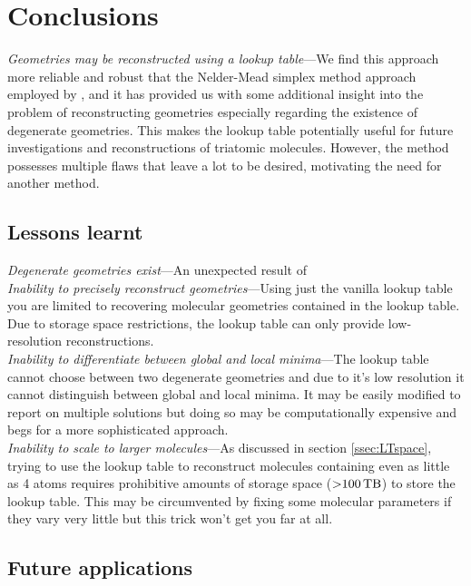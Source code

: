 \begin{figure}
  \label{fig:DegenerateGeometryTrajectories}
\end{figure}

\section{Conclusions}
\emph{Geometries may be reconstructed using a lookup table}---We find this approach more reliable and robust that the Nelder-Mead simplex method approach employed by \citet{Brichta09}, and it has provided us with some additional insight into the problem of reconstructing geometries especially regarding the existence of degenerate geometries. This makes the lookup table potentially useful for future investigations and reconstructions of triatomic molecules. However, the method possesses multiple flaws that leave a lot to be desired, motivating the need for another method.

\subsection{Lessons learnt}
\emph{Degenerate geometries exist}---An unexpected result of \\

\noindent
\emph{Inability to precisely reconstruct geometries}---Using just the vanilla lookup table you are limited to recovering molecular geometries contained in the lookup table. Due to storage space restrictions, the lookup table can only provide low-resolution reconstructions. \\

\noindent
\emph{Inability to differentiate between global and local minima}---The lookup table cannot choose between two degenerate geometries and due to it's low resolution it cannot distinguish between global and local minima. It may be easily modified to report on multiple solutions but doing so may be computationally expensive and begs for a more sophisticated approach. \\

\noindent
\emph{Inability to scale to larger molecules}---As discussed in section \ref{ssec:LTspace}, trying to use the lookup table to reconstruct molecules containing even as little as 4 atoms requires prohibitive amounts of storage space ($\SI{>100}{\tera\byte}$) to store the lookup table. This may be circumvented by fixing some molecular parameters if they vary very little but this trick won't get you far at all.

\subsection{Future applications}

